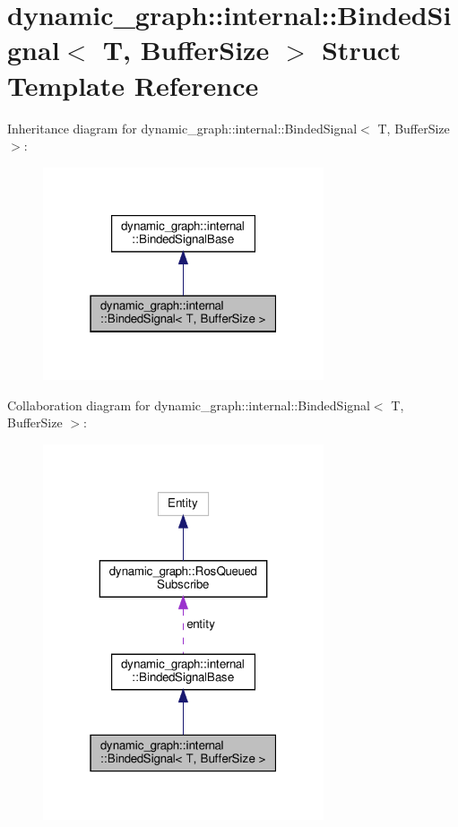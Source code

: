 \hypertarget{structdynamic__graph_1_1internal_1_1BindedSignal}{}\section{dynamic\+\_\+graph\+:\+:internal\+:\+:Binded\+Signal$<$ T, Buffer\+Size $>$ Struct Template Reference}
\label{structdynamic__graph_1_1internal_1_1BindedSignal}


Inheritance diagram for dynamic\+\_\+graph\+:\+:internal\+:\+:Binded\+Signal$<$ T, Buffer\+Size $>$\+:
\nopagebreak
\begin{figure}[H]
\begin{center}
\leavevmode
\includegraphics[width=235pt]{structdynamic__graph_1_1internal_1_1BindedSignal__inherit__graph}
\end{center}
\end{figure}


Collaboration diagram for dynamic\+\_\+graph\+:\+:internal\+:\+:Binded\+Signal$<$ T, Buffer\+Size $>$\+:
\nopagebreak
\begin{figure}[H]
\begin{center}
\leavevmode
\includegraphics[width=235pt]{structdynamic__graph_1_1internal_1_1BindedSignal__coll__graph}
\end{center}
\end{figure}
